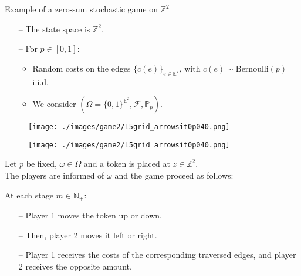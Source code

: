 \documentclass[11pt, mathserif]{beamer}
\begin{document}
    \begin{frame}{Example of a zero-sum stochastic game on $\mathbb{Z}^2$}    
        \begin{itemize}
            \item[--] The state space is $\mathbb{Z}^2$.
            \item[--] For $p \in [0, 1]$: 
                \begin{itemize}
                    \item Random costs on the edges $\{c(e)\}_{e \in \mathbb{E}^2}$, with $c(e) \sim \text{Bernoulli}(p)$ i.i.d.
                    \item We consider $(\Omega = \{0, 1\}^{\mathbb{E}^2}, \mathcal{F}, \mathbb{P}_p)$.
                \end{itemize}
        \end{itemize}
        \begin{figure}[!hbt]
          \centering
          \texttt{[image: ./images/game2/L5grid\_arrowsit0p040.png]}
        \end{figure}
    \end{frame}

    \begin{frame}  
        \begin{figure}[!hbt]
          \centering
          \texttt{[image: ./images/game2/L5grid\_arrowsit0p040.png]}
        \end{figure}

        Let $p$ be fixed, $\omega \in \Omega$ and a token is placed at $z \in \mathbb{Z}^2$.\\
        The players are informed of $\omega$ and the game proceed as follows:
        \vspace{0.2cm}

        At each stage $m \in \mathbb{N}_+$: 
        \begin{itemize}
            \item[--] Player 1 moves the token up or down.
            \item[--] Then, player 2 moves it left or right.
            \item[--] Player 1 receives the costs of the corresponding traversed edges, and player 2 receives the opposite amount.
        \end{itemize}
    \end{frame}
\end{document}
